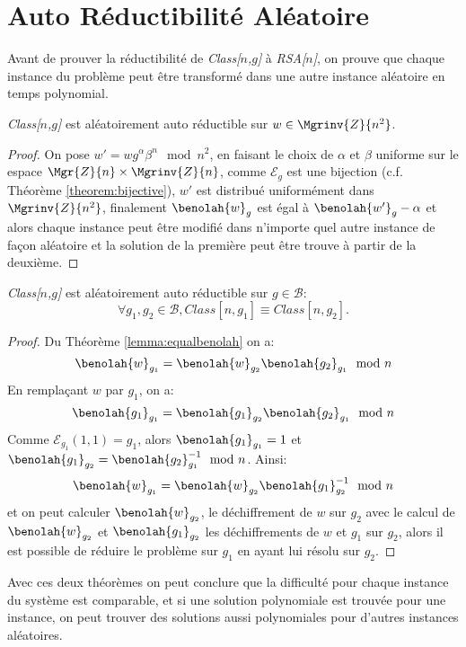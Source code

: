 \section{Auto Réductibilité Aléatoire}	
	Avant de prouver la réductibilité de \emph{Class[$n$,$g$]} à \emph{RSA[$n$]}, on prouve que 
	chaque instance du problème peut être transformé dans une autre instance aléatoire en temps polynomial.

	\begin{lemma} \emph{Class[$n$,$g$]} est aléatoirement auto réductible sur $w\in\Mgrinv{Z}{n^2}$.
		\begin{proof}
			On pose $w' = wg^\alpha\beta^n\mod{n^2}$, en faisant le choix de $\alpha$ et $\beta$ 
			uniforme sur le espace $\Mgr{Z}{n} \times \Mgrinv{Z}{n}$, comme $\mathcal{E}_g$ est une 
			bijection (c.f. Théorème \ref{theorem:bijective}), $w'$ est distribué uniformément dans
			$\Mgrinv{Z}{n^2}$, finalement $\benolah{w}_g$ est égal à  $\benolah{w'}_g-\alpha$  et alors chaque 
			instance peut être modifié dans n'importe quel autre instance de façon aléatoire et la 
			solution de la première peut être trouve à partir de la deuxième.
		\end{proof}
	\end{lemma}

	\begin{lemma} \emph{Class[$n$,$g$]} est aléatoirement auto réductible sur $g\in\mathcal{B}$:
				$$\forall g_1, g_2 \in \mathcal{B}, Class[n,g_1] \equiv Class[n,g_2].$$
		\begin{proof}
			Du Théorème \ref{lemma:equalbenolah} on a:
				$$\benolah{w}_{g_1} = \benolah{w}_{g_2}\benolah{g_2}_{g_1}\mod{n}$$
				En remplaçant $w$ par $g_1$, on a:
				$$\benolah{g_1}_{g_1} = \benolah{g_1}_{g_2}\benolah{g_2}_{g_1}\mod{n}$$
				Comme $\mathcal{E}_{g_1}(1,1) = g_1$, alors $\benolah{g_1}_{g_1} = 1$ et 
				$\benolah{g_1}_{g_2} = \benolah{g_2}_{g_1}^{-1}\mod{n}$. Ainsi:
				$$\benolah{w}_{g_1} = \benolah{w}_{g_2}\benolah{g_1}_{g_2}^{-1}\mod{n}$$
				et on peut calculer $\benolah{w}_{g_2}$, le déchiffrement de $w$ sur $g_2$ 
				avec le calcul de $\benolah{w}_{g_2}$ et $\benolah{g_1}_{g_2}$ les déchiffrements 
				de $w$ et $g_1$ sur $g_2$, alors il est possible de réduire le problème 
				sur $g_1$ en ayant lui résolu sur $g_2$.
		\end{proof}
	\end{lemma}

	Avec ces deux théorèmes on peut conclure que la difficulté pour chaque instance du système est comparable, 
	et si une solution polynomiale est trou\-vée pour une instance, on peut trouver des solutions aussi 
	polynomiales pour d'autres instances aléatoires.

